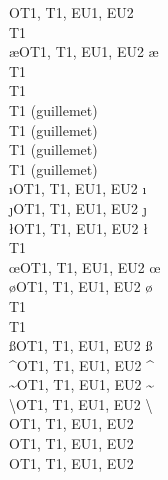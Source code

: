 \begin{tabbing}
\ttverb\SS                \>OT1, T1, EU1, EU2\>   \SS \>               \\
\ttverb\TH                \>T1    \>   \TH \>               \\
\ttverb\ae                \>OT1, T1, EU1, EU2\>   \ae \>               \\
\ttverb\dh                \>T1    \>   \dh \>               \\
\ttverb\dj                \>T1    \>   \dj \>               \\
\ttverb\guillemotleft     \>T1    \>   \guillemotleft  \> (guillemet) \\
\ttverb\guillemotright    \>T1    \>   \guillemotright \> (guillemet) \\
\ttverb\guilsinglleft     \>T1    \>   \guilsinglleft  \> (guillemet) \\
\ttverb\guilsinglright    \>T1    \>   \guilsinglright \> (guillemet) \\
\ttverb\i                 \>OT1, T1, EU1, EU2\>   \i  \>               \\
\ttverb\j                 \>OT1, T1, EU1, EU2\>   \j  \>               \\
\ttverb\l                 \>OT1, T1, EU1, EU2\>   \l  \>               \\
\ttverb\ng                \>T1    \>   \ng \>               \\
\ttverb\oe                \>OT1, T1, EU1, EU2\>   \oe \>               \\
\ttverb\o                 \>OT1, T1, EU1, EU2\>   \o  \>               \\
\ttverb\quotedblbase      \>T1    \>   \quotedblbase   \>   \\
\ttverb\quotesinglbase    \>T1    \>   \quotesinglbase \>   \\
\ttverb\ss                \>OT1, T1, EU1, EU2\>   \ss \>               \\
\ttverb\textasciicircum   \>OT1, T1, EU1, EU2\>   \textasciicircum \>  \\
\ttverb\textasciitilde    \>OT1, T1, EU1, EU2\>   \textasciitilde  \>  \\
\ttverb\textbackslash     \>OT1, T1, EU1, EU2\>   \textbackslash   \>  \\
\ttverb\textbar           \>OT1, T1, EU1, EU2\>   \textbar         \>  \\
\ttverb\textbraceleft     \>OT1, T1, EU1, EU2\>   \textbraceleft   \>  \\
\ttverb\textbraceright    \>OT1, T1, EU1, EU2\>   \textbraceright  \>  \\

\end{tabbing}
